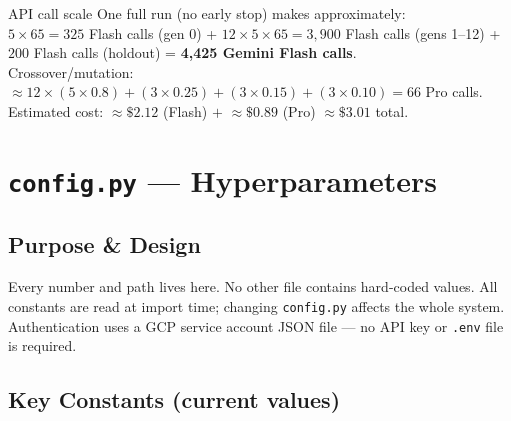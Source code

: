 \documentclass[11pt,a4paper]{report}
\newcommand{\pyf}[1]{\texttt{#1}}
\begin{document}
\begin{concept}{API call scale}
One full run (no early stop) makes approximately:\\
$5 \times 65 = 325$ Flash calls (gen 0) +
$12 \times 5 \times 65 = 3{,}900$ Flash calls (gens 1--12) +
$200$ Flash calls (holdout) = \textbf{4,425 Gemini Flash calls}.\\
Crossover/mutation: $\approx 12 \times (5 \times 0.8) + (3 \times 0.25) + (3 \times 0.15) + (3 \times 0.10) = 66$ Pro calls.\\
Estimated cost: $\approx\$2.12$ (Flash) $+$ $\approx\$0.89$ (Pro) $\approx \$3.01$ total.
\end{concept}


\chapter{\pyf{config.py} --- Hyperparameters}

\section{Purpose \& Design}

Every number and path lives here.  No other file contains hard-coded values.
All constants are read at import time; changing \pyf{config.py} affects the whole system.
Authentication uses a GCP service account JSON file --- no API key or \texttt{.env}
file is required.

\section{Key Constants (current values)}
\end{document}
